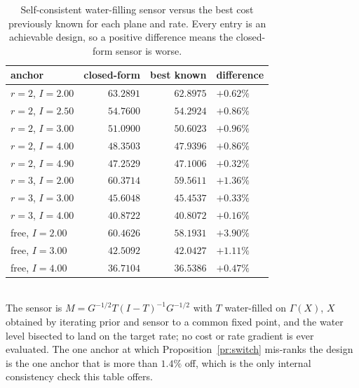 \documentclass[journal]{IEEEtran}
\theoremstyle{remark}
\begin{document}
\begin{table}[h]
 \centering\caption{Self-consistent water-filling sensor versus the best cost
 previously known for each plane and rate. Every entry is an achievable design,
 so a positive difference means the closed-form sensor is worse.}
 \label{tab:wfdesign}
 \begin{tabularx}{\columnwidth}{Xrrl}
 \hline
 anchor & closed-form & best known & difference \\
 \hline
 $r=2$, $I=2.00$ & $63.2891$ & $62.8975$ & $+0.62\%$ \\
 $r=2$, $I=2.50$ & $54.7600$ & $54.2924$ & $+0.86\%$ \\
 $r=2$, $I=3.00$ & $51.0900$ & $50.6023$ & $+0.96\%$ \\
 $r=2$, $I=4.00$ & $48.3503$ & $47.9396$ & $+0.86\%$ \\
 $r=2$, $I=4.90$ & $47.2529$ & $47.1006$ & $+0.32\%$ \\
 $r=3$, $I=2.00$ & $60.3714$ & $59.5611$ & $+1.36\%$ \\
 $r=3$, $I=3.00$ & $45.6048$ & $45.4537$ & $+0.33\%$ \\
 $r=3$, $I=4.00$ & $40.8722$ & $40.8072$ & $+0.16\%$ \\
 free, $I=2.00$ & $60.4626$ & $58.1931$ & $+3.90\%$ \\
 free, $I=3.00$ & $42.5092$ & $42.0427$ & $+1.11\%$ \\
 free, $I=4.00$ & $36.7104$ & $36.5386$ & $+0.47\%$ \\
 \hline
 \end{tabularx}
 \\[1pt]{\scriptsize The sensor is $M=G^{-1/2}T(I-T)^{-1}G^{-1/2}$ with $T$
 water-filled on $\Gamma(X)$, $X$ obtained by iterating prior and sensor to a
 common fixed point, and the water level bisected to land on the target rate;
 no cost or rate gradient is ever evaluated. The one anchor at which
 Proposition~\ref{pr:switch} mis-ranks the design is the one anchor that is
 more than $1.4\%$ off, which is the only internal consistency check this table
 offers. }
\end{table}
\end{document}
